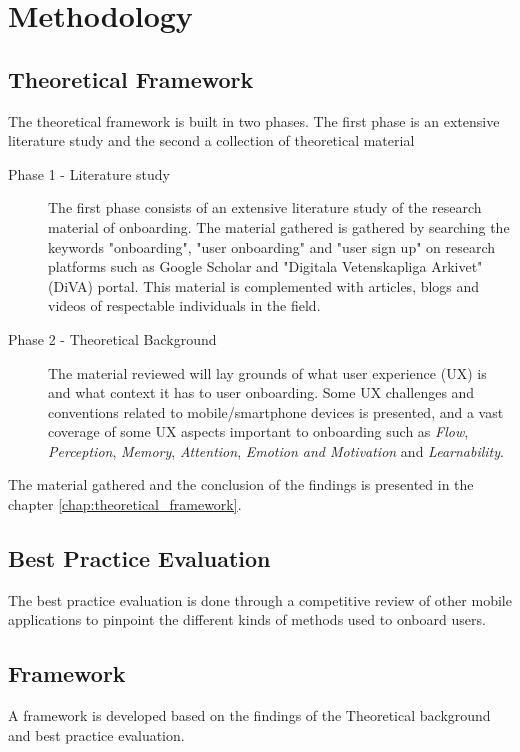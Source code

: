 \chapter{Methodology}
\label{chap:methodology}

\section{Theoretical Framework}
The theoretical framework is built in two phases. The first phase is an extensive literature study and the second a collection of theoretical material

\begin{description}
  \item [Phase 1 - Literature study] The first phase consists of an extensive literature study of the research material of onboarding. The material gathered is gathered by searching the keywords "onboarding", "user onboarding" and "user sign up" on research platforms such as Google Scholar and "Digitala Vetenskapliga Arkivet" (DiVA) portal. This material is complemented with articles, blogs and videos of respectable individuals in the field.
  \item [Phase 2 - Theoretical Background] The material reviewed will lay grounds of what user experience (UX) is and what context it has to user onboarding. Some UX challenges and conventions related to mobile/smartphone devices is presented, and a vast coverage of some UX aspects important to onboarding such as \textit{Flow}, \textit{Perception}, \textit{Memory}, \textit{Attention}, \textit{Emotion and Motivation} and \textit{Learnability}.
\end{description}

The material gathered and the conclusion of the findings is presented in the chapter \ref{chap:theoretical_framework}.

\section{Best Practice Evaluation}
%
The best practice evaluation is done through a competitive review \cite{Schade2013} of other mobile applications to pinpoint the different kinds of methods used to onboard users.

\section{Framework}
A framework is developed based on the findings of the Theoretical background and best practice evaluation.


